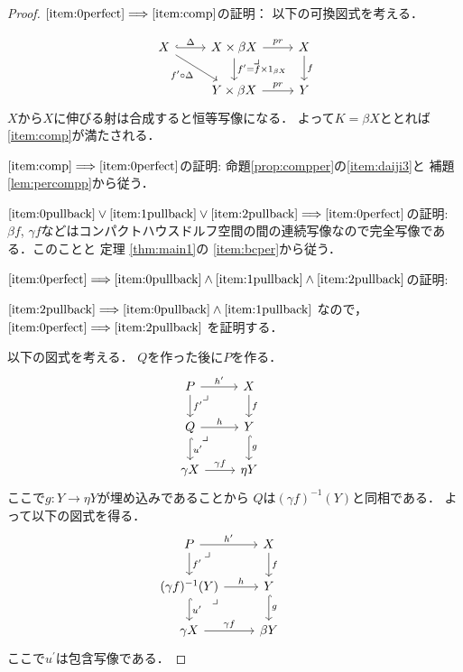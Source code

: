 \documentclass[leqno, a4paper, 12pt, dvipdfmx]{jsarticle}
\newcommand{\To}{\Longrightarrow}
\begin{document}
\begin{proof}

$\ref{item:0perfect}\To \ref{item:comp}$の証明：
以下の可換図式を考える．


\[
\begin{tikzcd}
X \arrow[r, hook, "\Delta"] \arrow[dr, "f^{\prime}\circ \Delta"']& X\times \beta X \arrow[r, "pr"] \arrow[d, "f^{\prime}=f\times 1_{\beta X}"] \arrow[dr, phantom, "\lrcorner", very near start]
& X \arrow[d,"f"] \\
& Y\times \beta X \arrow[r,"pr"] & Y
\end{tikzcd}
\]
$X$から$X$に伸びる射は合成すると恒等写像になる．
よって$K=\beta X$ととれば
\ref{item:comp}が満たされる．


$\ref{item:comp}\To \ref{item:0perfect}$の証明:
命題\ref{prop:compper}の\ref{item:daiji3}と
補題\ref{lem:percompp}から従う．

$\ref{item:0pullback}\lor \ref{item:1pullback}\lor \ref{item:2pullback}\To \ref{item:0perfect}$の証明: 
$\beta f$, $\gamma f$などはコンパクトハウスドルフ空間の間の連続写像なので完全写像である．このことと
定理
\ref{thm:main1}の
\ref{item:bcper}から従う．







$\ref{item:0perfect}\To \ref{item:0pullback}\land \ref{item:1pullback}\land \ref{item:2pullback}$の証明:

$\ref{item:2pullback}\To \ref{item:0pullback}\land\ref{item:1pullback}$
なので，
$\ref{item:0perfect}\To \ref{item:2pullback}$
を証明する．



以下の図式を考える．
$Q$を作った後に$P$を作る．
\[
\begin{tikzcd}
P \arrow[r, "h^{\prime}"] \arrow[d, "f^{\prime}"] \arrow[dr, phantom, "\lrcorner", very near start]
& X \arrow[d,"f"] & \\
Q  \arrow[dr, phantom, "\lrcorner", very near start]\arrow[r,"h"] \arrow[d, hook, "u^{\prime}"] & Y \arrow[d, hook, "g"] \\
\gamma X\arrow[r,"\gamma f"] &  \eta Y
\end{tikzcd}
\]
ここで$g\colon Y\to \eta Y$が埋め込みであることから
$Q$は$(\gamma f)^{-1}(Y)$と同相である．
よって以下の図式を得る．
\[
\begin{tikzcd}
P \arrow[r, "h^{\prime}"] \arrow[d, "f^{\prime}"] \arrow[dr, phantom, "\lrcorner", very near start]
& X \arrow[d,"f"] & \\
(\gamma f)^{-1}(Y)  \arrow[dr, phantom, "\lrcorner", very near start]\arrow[r,"h"] \arrow[d, hook, "u^{\prime}"] & Y \arrow[d, hook, "g"] \\
\gamma X\arrow[r,"\gamma f"] &  \beta Y
\end{tikzcd}
\]
ここで$u^{\prime}$は包含写像である．


\end{proof}
\end{document}
